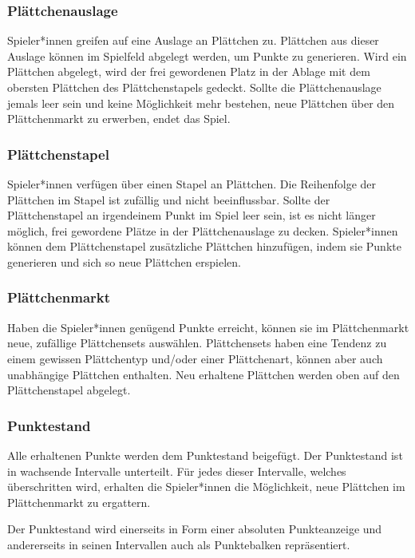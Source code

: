 \documentclass[../main.tex]{subfiles}
\begin{document}
	\subsubsection{Plättchenauslage}
	\par Spieler*innen greifen auf eine Auslage an Plättchen zu. Plättchen aus dieser Auslage können im Spielfeld abgelegt werden, um Punkte zu generieren. Wird ein Plättchen abgelegt, wird der frei gewordenen Platz in der Ablage mit dem obersten Plättchen des Plättchenstapels gedeckt. Sollte die Plättchenauslage jemals leer sein und keine Möglichkeit mehr bestehen, neue Plättchen über den Plättchenmarkt zu erwerben, endet das Spiel.
	
	\subsubsection{Plättchenstapel}
	\par Spieler*innen verfügen über einen Stapel an Plättchen. Die Reihenfolge der Plättchen im Stapel ist zufällig und nicht beeinflussbar. Sollte der Plättchenstapel an irgendeinem Punkt im Spiel leer sein, ist es nicht länger möglich, frei gewordene Plätze in der Plättchenauslage zu decken. Spieler*innen können dem Plättchenstapel zusätzliche Plättchen hinzufügen, indem sie Punkte generieren und sich so neue Plättchen erspielen.
	
	\subsubsection{Plättchenmarkt}
	\par Haben die Spieler*innen genügend Punkte erreicht, können sie im Plättchenmarkt neue, zufällige Plättchensets auswählen. Plättchensets haben eine Tendenz zu einem gewissen Plättchentyp und/oder einer Plättchenart, können aber auch unabhängige Plättchen enthalten. Neu erhaltene Plättchen werden oben auf den Plättchenstapel abgelegt.
	
	\subsubsection{Punktestand}
	\par Alle erhaltenen Punkte werden dem Punktestand beigefügt. Der Punktestand ist in wachsende Intervalle unterteilt. Für jedes dieser Intervalle, welches überschritten wird, erhalten die Spieler*innen die Möglichkeit, neue Plättchen im Plättchenmarkt zu ergattern.
	\par Der Punktestand wird einerseits in Form einer absoluten Punkteanzeige und andererseits in seinen Intervallen auch als Punktebalken repräsentiert.
\end{document}
